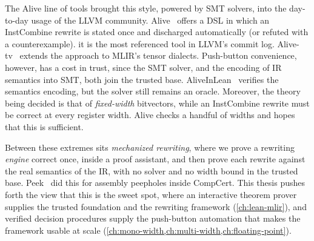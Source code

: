 The Alive line of tools brought this style, powered by SMT solvers, into the
day-to-day usage of the LLVM community. Alive~\citep{lopes2015provably, lopes2021alive2} offers a
DSL in which an InstCombine rewrite is stated once and discharged
automatically (or refuted with a counterexample). it is the most referenced tool in LLVM's commit log.
Alive-tv~\citep{DBLP:conf/cav/BangNCJL22} extends the approach to MLIR's
tensor dialects. Push-button convenience, however, has a cost in trust, since the
SMT solver, and the encoding of IR semantics into SMT, both join the trusted
base. AliveInLean~\citep{lee2019aliveinlean} verifies the semantics encoding, but the
solver still remains an oracle. Moreover, the theory being decided is that of
\emph{fixed-width} bitvectors, while an InstCombine rewrite must be correct at
every register width. Alive checks a handful of widths and hopes that this is sufficient.

Between these extremes sits \emph{mechanized rewriting}, where we prove a rewriting
\emph{engine} correct once, inside a proof assistant, and then prove each
rewrite against the real semantics of the IR, with no solver and no width bound in the trusted base.
Peek~\citep{mullen2016verified} did this for assembly peepholes inside CompCert.
This thesis pushes forth the view that this is the sweet spot,
where an interactive theorem prover supplies the
trusted foundation and the rewriting framework (\cref{ch:lean-mlir}), and
verified decision procedures supply the push-button automation that makes the
framework usable at scale (\cref{ch:mono-width,ch:multi-width,ch:floating-point}).

